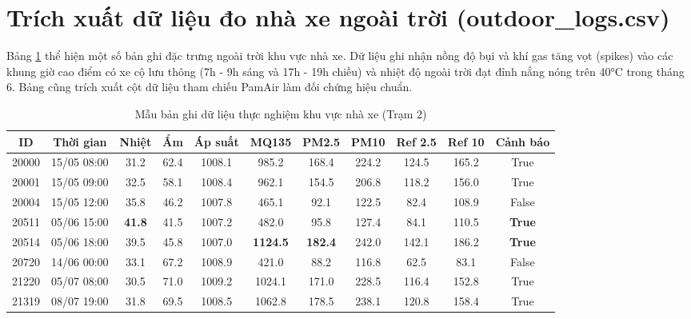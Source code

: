 \section{Trích xuất dữ liệu đo nhà xe ngoài trời (outdoor\_logs.csv)}
Bảng \ref{tab:sampleoutdoordata} thể hiện một số bản ghi đặc trưng ngoài trời khu vực nhà xe. Dữ liệu ghi nhận nồng độ bụi và khí gas tăng vọt (spikes) vào các khung giờ cao điểm có xe cộ lưu thông (7h - 9h sáng và 17h - 19h chiều) và nhiệt độ ngoài trời đạt đỉnh nắng nóng trên 40°C trong tháng 6. Bảng cũng trích xuất cột dữ liệu tham chiếu PamAir làm đối chứng hiệu chuẩn.

\begin{table}[H]
\centering
\caption{Mẫu bản ghi dữ liệu thực nghiệm khu vực nhà xe (Trạm 2)}
\label{tab:sampleoutdoordata}
\begin{small}
\begin{tabular}{ccccccccccc}
\toprule
\textbf{ID} & \textbf{Thời gian} & \textbf{Nhiệt} & \textbf{Ẩm} & \textbf{Áp suất} & \textbf{MQ135} & \textbf{PM2.5} & \textbf{PM10} & \textbf{Ref 2.5} & \textbf{Ref 10} & \textbf{Cảnh báo} \\
\midrule
20000 & 15/05 08:00 & 31.2 & 62.4 & 1008.1 & 985.2 & 168.4 & 224.2 & 124.5 & 165.2 & True \\
20001 & 15/05 09:00 & 32.5 & 58.1 & 1008.4 & 962.1 & 154.5 & 206.8 & 118.2 & 156.0 & True \\
20004 & 15/05 12:00 & 35.8 & 46.2 & 1007.8 & 465.1 & 92.1  & 122.5 & 82.4  & 108.9 & False \\
20511 & 05/06 15:00 & \textbf{41.8} & 41.5 & 1007.2 & 482.0 & 95.8  & 127.4 & 84.1  & 110.5 & \textbf{True} \\
20514 & 05/06 18:00 & 39.5 & 45.8 & 1007.0 & \textbf{1124.5}& \textbf{182.4}& 242.0 & 142.1 & 186.2 & \textbf{True} \\
20720 & 14/06 00:00 & 33.1 & 67.2 & 1008.9 & 421.0 & 88.2  & 116.8 & 62.5  & 83.1  & False \\
21220 & 05/07 08:00 & 30.5 & 71.0 & 1009.2 & 1024.1& 171.0 & 228.5 & 116.4 & 152.8 & True \\
21319 & 08/07 19:00 & 31.8 & 69.5 & 1008.5 & 1062.8& 178.5 & 238.1 & 120.8 & 158.4 & True \\
\bottomrule
\end{tabular}
\end{small}
\end{table}
